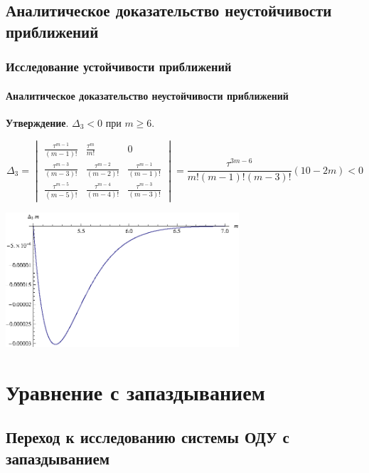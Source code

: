 \documentclass{beamer}
\numberwithin{equation}{section}
\begin{document}
    \subsection{Аналитическое доказательство неустойчивости приближений}
    \begin{frame}
        \frametitle{Исследование устойчивости приближений}
        \framesubtitle{Аналитическое доказательство неустойчивости приближений}

        \textbf{Утверждение}. $\Delta_3 < 0$ при $m \geq 6$.

        \begin{equation}
            \Delta_3 = 
            \begin{vmatrix}
                \frac{\tau^{m-1}}{(m-1)!} & \frac{\tau^{m}}{m!} & 0\\
                \frac{\tau^{m-3}}{(m-3)!} & \frac{\tau^{m-2}}{(m-2)!} & \frac{\tau^{m-1}}{(m-1)!}\\
                \frac{\tau^{m-5}}{(m-5)!} & \frac{\tau^{m-4}}{(m-4)!} & \frac{\tau^{m-3}}{(m-3)!}
            \end{vmatrix} =
            \dfrac{\tau^{3m-6}}{m!(m-1)!(m-3)!} (10-2m) < 0
        \end{equation}

        \begin{center}
            \includegraphics[width=0.65\textwidth]{coefCheck.eps}
        \end{center}
    
    \end{frame}

    \section{Уравнение с запаздыванием}

    \subsection{Переход к исследованию системы ОДУ с запаздыванием}
\end{document}
